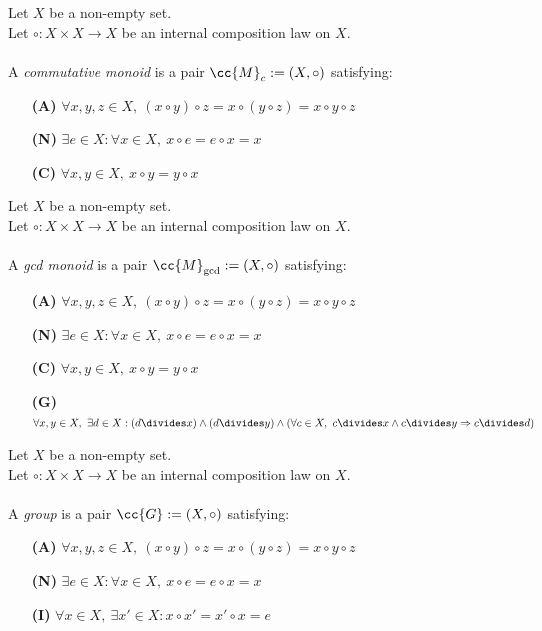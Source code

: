 \begin{definition-pre}
    \label{def:commutative_monoid}
    Let $X$ be a non-empty set.\\
    Let $\circ: X\times X \to X$ be an internal composition law on $X$. \\\\
    A \textit{commutative monoid} is a pair $\cc{M}_c:= (X, \circ)$ satisfying:
    \begin{enumerate}
        \item [\textbf{(A)}] $\forall x,y,z\in X,\ (x\circ y)\circ z= x\circ (y\circ z) = x\circ y \circ z$
        \item [\textbf{(N)}] $\exists e \in X : \forall x \in X,\ x\circ e = e \circ x = x$
        \item [\textbf{(C)}] $\forall x,y\in X,\ x\circ y = y\circ x$
    \end{enumerate}
\end{definition-pre}

\begin{definition-pre}
    \label{def:gcd_monoid}
    Let $X$ be a non-empty set.\\
    Let $\circ: X\times X \to X$ be an internal composition law on $X$. \\\\
    A \textit{gcd monoid} is a pair $\cc{M}_{\gcd}:= (X, \circ)$ satisfying:
    \begin{enumerate}
        \item [\textbf{(A)}] $\forall x,y,z\in X,\ (x\circ y)\circ z= x\circ (y\circ z) = x\circ y \circ z$
        \item [\textbf{(N)}] $\exists e \in X : \forall x \in X,\ x\circ e = e \circ x = x$
        \item [\textbf{(C)}] $\forall x,y\in X,\ x\circ y = y\circ x$
        \item [\textbf{(G)}] $\forall x,y\in X,\ \exists d \in X : (d\divides x) \land (d\divides y)
                             \land \left(\forall c \in X,\ c\divides x \land c\divides y \Rightarrow c\divides d\right)$
    \end{enumerate}
\end{definition-pre}

\begin{definition-pre}[Group]
    \label{def:group}
    Let $X$ be a non-empty set.\\
    Let $\circ: X\times X \to X$ be an internal composition law on $X$. \\\\
    A \textit{group} is a pair $\cc{G}:= (X, \circ)$ satisfying:
    \begin{enumerate}
        \item [\textbf{(A)}] $\forall x,y,z\in X,\ (x\circ y)\circ z= x\circ (y\circ z) = x\circ y \circ z$
        \item [\textbf{(N)}] $\exists e \in X : \forall x \in X,\ x\circ e = e \circ x = x$
        \item [\textbf{(I)}] $\forall x \in X,\ \exists x'\in X: x\circ x' = x'\circ x = e$
    \end{enumerate}
\end{definition-pre}

